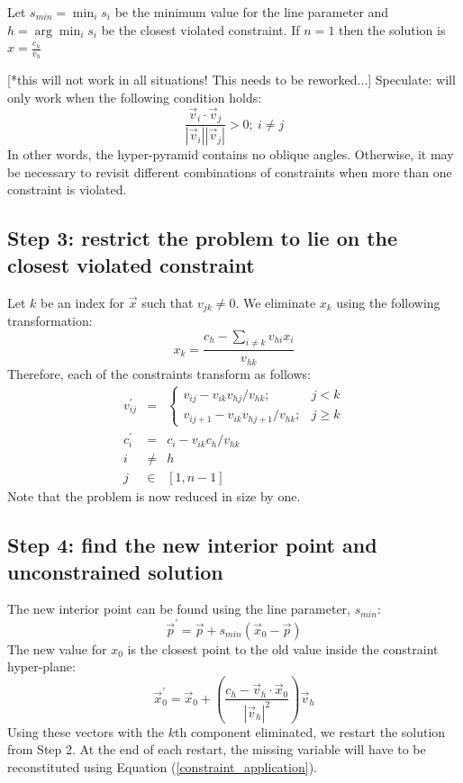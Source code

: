 \documentclass{article}
\begin{document}
Let $s_{min}=\min_i s_i$ be the minimum value for the line parameter and 
$h=\arg \min_i s_i$ be the closest violated constraint.
If $n=1$ then the solution is $x=\frac{c_h}{v_h}$

[*this will not work in all situations! This needs to be reworked...]
Speculate: will only work when the following condition holds:
\begin{equation}
	\frac{\vec v_i \cdot \vec v_j}{|\vec v_i||\vec v_j|} > 0;~i \ne j
\end{equation}
In other words, the hyper-pyramid contains no oblique angles.
Otherwise, it may be necessary to revisit different combinations of constraints
when more than one constraint is violated.

\subsection{Step 3: restrict the problem to lie on the closest violated constraint}

Let $k$ be an index for $\vec x$ such that $v_{jk} \ne 0$. 
We eliminate $x_k$ using the following transformation:
\begin{equation}
	x_k = \frac{c_h - \sum_{i \ne k} v_{hi} x_i}{v_{hk}}
	\label{constraint_application}
\end{equation}
Therefore, each of the constraints transform as follows:
\begin{eqnarray}
	v_{ij}^\prime & = & \left \lbrace \begin{array}{rc} 
	v_{ij} - {v_{ik} v_{hj}}/{v_{hk}} ; & j < k \\
	v_{ij+1} - {v_{ik} v_{hj+1}}/{v_{hk}} ; & j \ge k
	\end{array} \right . \\
	c_i^\prime & = & c_i - {v_{ik} c_h}/{v_{hk}} \\
	i & \ne & h \\
	j & \in & [1, n-1]
\end{eqnarray}
Note that the problem is now reduced in size by one.

\subsection{Step 4: find the new interior point and unconstrained solution}

The new interior point can be found using the line parameter, $s_{min}$:
\begin{equation}
	\vec p^\prime = \vec p + s_{min} (\vec x_0 - \vec p)
\end{equation}
The new value for $x_0$ is the closest point to the old value inside the
constraint hyper-plane:
\begin{equation}
	\vec x_0^\prime = \vec x_0 + \left ( \frac{c_h - \vec v_h \cdot \vec x_0}{| \vec v_h |^2} \right ) \vec v_h
\end{equation}
Using these vectors with the $k$th component eliminated, we restart the
solution from Step 2.
At the end of each restart, the missing variable will have to be reconstituted
using Equation (\ref{constraint_application}).
\end{document}
